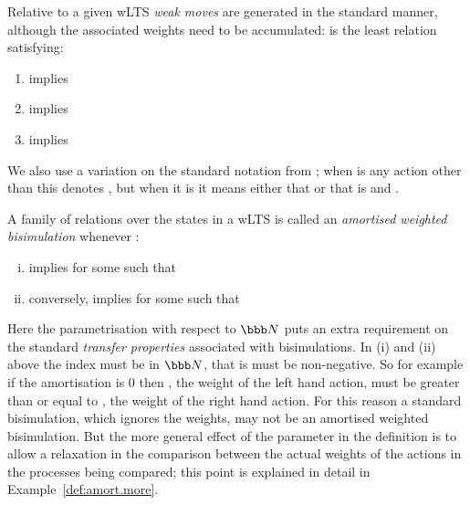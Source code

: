 \documentclass{LMCS}
\newcommand{\nats}{\ensuremath{\bbb N}\xspace}
\newcommand{\EndDefBox}{\null\hfill}
\newcommand{\boxHere}{\global\let\EndProof\empty\EndDefBox}
\begin{document}
Relative to a given wLTS \emph{weak moves} are generated in the
standard manner, although the associated weights need to be
accumulated:  is the least relation satisfying:
\begin{enumerate}[]
\item  implies  

\item   implies 

\item   implies 
\end{enumerate}
We also use a variation on the standard notation  from  \cite{ccs};
when  is any action other than  this denotes  , but when it is 
 it means either that  or that  is  and .

\begin{defi}\label{def:amort}
  A family of relations  over the states in
  a wLTS is called an \emph{amortised weighted bisimulation} whenever :
\begin{enumerate}[(i)]
\item  implies  for some  such that
    

\item conversely, 
  implies  for some  such that
      \boxHere
\end{enumerate}
\end{defi}
\noindent
Here the parametrisation with respect to \nats puts an extra
requirement on the standard \emph{transfer properties} associated with
bisimulations. In (i) and (ii) above the index  must be in
\nats, that is must be non-negative. So for example if the
amortisation  is 0 then , the weight of the left hand action,
must be greater than or equal to , the weight of the right hand
action. For this reason a standard bisimulation, which ignores the
weights, may not be an amortised weighted bisimulation. But the more
general effect of the parameter  in the definition is to allow a
relaxation in the comparison between the actual weights of the
actions in the processes being compared; this point is explained in
detail in Example~\ref{def:amort.more}.
\end{document}

